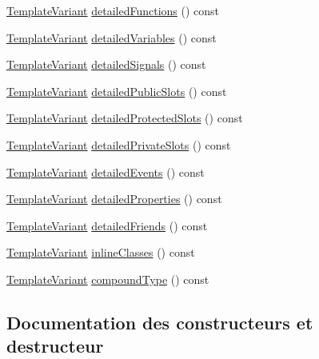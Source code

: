 \begin{DoxyCompactItemize}
\item 
\hyperlink{class_template_variant}{Template\+Variant} \hyperlink{class_module_context_1_1_private_a51b8b2aba20e5638d479b574bf3b32c7}{detailed\+Functions} () const 
\item 
\hyperlink{class_template_variant}{Template\+Variant} \hyperlink{class_module_context_1_1_private_ac995d6e3ed6f40ed26d2cc76af41feb5}{detailed\+Variables} () const 
\item 
\hyperlink{class_template_variant}{Template\+Variant} \hyperlink{class_module_context_1_1_private_ae548706cbceb47c1e5e5c1a7b29f0176}{detailed\+Signals} () const 
\item 
\hyperlink{class_template_variant}{Template\+Variant} \hyperlink{class_module_context_1_1_private_ada161a412777deafa53f9e69132fc81c}{detailed\+Public\+Slots} () const 
\item 
\hyperlink{class_template_variant}{Template\+Variant} \hyperlink{class_module_context_1_1_private_a25ad5cea18244429aebd0baa2adf8ba9}{detailed\+Protected\+Slots} () const 
\item 
\hyperlink{class_template_variant}{Template\+Variant} \hyperlink{class_module_context_1_1_private_a6f21fe2f04731a34c5ef7ddf03038668}{detailed\+Private\+Slots} () const 
\item 
\hyperlink{class_template_variant}{Template\+Variant} \hyperlink{class_module_context_1_1_private_a7254d8c0aed7897684911c07f1faa63a}{detailed\+Events} () const 
\item 
\hyperlink{class_template_variant}{Template\+Variant} \hyperlink{class_module_context_1_1_private_a5fa6f93dbaf8374ee84d04af8f5a085c}{detailed\+Properties} () const 
\item 
\hyperlink{class_template_variant}{Template\+Variant} \hyperlink{class_module_context_1_1_private_aea6ae8bddd69ea37855863aff6347895}{detailed\+Friends} () const 
\item 
\hyperlink{class_template_variant}{Template\+Variant} \hyperlink{class_module_context_1_1_private_a08839b4aebe0684b7ca0e6618c5d9720}{inline\+Classes} () const 
\item 
\hyperlink{class_template_variant}{Template\+Variant} \hyperlink{class_module_context_1_1_private_abaee194bcc55a1726cbc9673408bf70c}{compound\+Type} () const 
\end{DoxyCompactItemize}


\subsection{Documentation des constructeurs et destructeur}
\hypertarget{class_module_context_1_1_private_a8346194553f06510821e54641ca6ec43}{}
